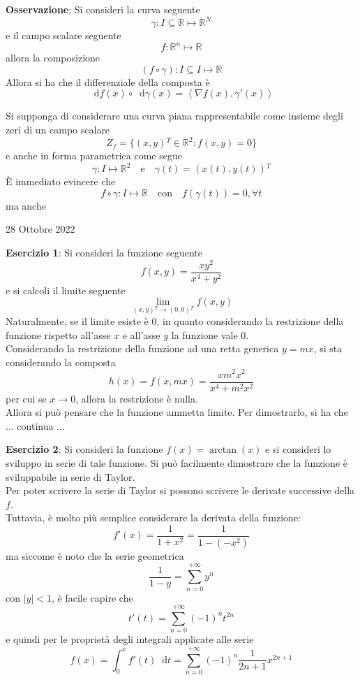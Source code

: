 \documentclass[a4paper]{extarticle}
\newcommand*\dif{\mathop{}\!\mathrm{d}}
\begin{document}
\vspace{2em}
\noindent
\textbf{Osservazione}: Si consideri la curva seguente
\[\gamma : I \subseteq \mathbb{R} \longmapsto \mathbb{R}^N\]
e il campo scalare seguente
\[f : \mathbb{R}^n \longmapsto \mathbb{R}\]
allora la composizione
\[\left(f \circ \gamma\right) : I \subseteq I \longmapsto \mathbb{R}\]
Allora si ha che il differenziale della composta è
\[\dif f(x) \circ \dif \gamma(x) = \left<\nabla f(x), \gamma'(x)\right>\]

\vspace{2em}
\noindent
Si supponga di considerare una curva piana rappresentabile come insieme degli zeri di un campo scalare
\[Z_f = \{(x,y){^T} \in \mathbb{R}^2 : f(x,y) = 0\}\]
e anche in forma parametrica come segue
\[\gamma : I \longmapsto \mathbb{R}^2 \hspace{1em} \text{e} \hspace{1em} \gamma(t) = (x(t),y(t)){^T}\]
È immediato evincere che
\[f \circ \gamma : I \longmapsto \mathbb{R} \hspace{1em} \text{con} \hspace{1em} f(\gamma(t)) = 0, \forall t\]
ma anche


\newpage
\noindent
\begin{center}
    28 Ottobre 2022
\end{center}

\vspace{1em}
\noindent
\textbf{Esercizio 1}: Si consideri la funzione seguente
\[f(x,y) = \dfrac{xy^2}{x^4+y^2}\]
e si calcoli il limite seguente
\[\lim_{(x,y){^T} \to (0,0){^T}} f(x,y)\]
Naturalmente, se il limite esiste è $0$, in quanto considerando la restrizione della funzione rispetto all'asse $x$ e all'asse $y$ la funzione vale $0$.\\
Considerando la restrizione della funzione ad una retta generica $y=mx$, si sta considerando la composta
\[h(x)=f(x,mx)=\frac{xm^2x^2}{x^4+m^2x^2}\]
per cui se $x \to 0$, allora la restrizione è nulla.\\
Allora si può pensare che la funzione ammetta limite. Per dimostrarlo, si ha che ... continua ...

\vspace{1em}
\noindent
\textbf{Esercizio 2}: Si consideri la funzione $f(x)=\arctan(x)$ e si consideri lo sviluppo in serie di tale funzione. Si può facilmente dimostrare che la funzione è sviluppabile in serie di Taylor.\\
Per poter scrivere la serie di Taylor si possono scrivere le derivate successive della $f$.\\
Tuttavia, è molto più semplice considerare la derivata della funzione:
\[f'(x)=\frac{1}{1+x^2}=\frac{1}{1-(-x^2)}\]
ma siccome è noto che la serie geometrica
\[\frac{1}{1-y}=\sum_{n=0}^{+\infty} y^n\]
con $\left \vert y \right \vert < 1$, è facile capire che
\[t'(t)=\sum_{n=0}^{+\infty}(-1)^n t^{2n}\]
e quindi per le proprietà degli integrali applicate alle serie
\[f(x)=\int_0^x f'(t) \dif t = \sum_{n=0}^{+\infty} (-1)^n \frac{1}{2n+1} x^{2n+1}\]
\end{document}
